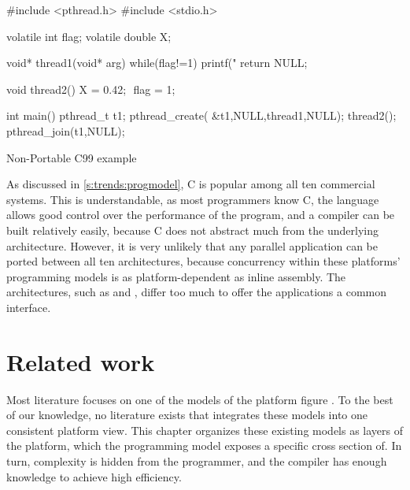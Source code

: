 \begin{lstcols}{2}%
\begin{lstcode}[variable={flag,X,arg,t1,arg},type={pthread_t}]
#include <pthread.h>
#include <stdio.h>

volatile int flag;
volatile double X;

void* thread1(void* arg){
	while(flag!=1){}
	printf("%
	return NULL;
}

void thread2(){
	X = 0.42; $\label{line:progmodel:c99:wr_double}$
	flag = 1;
}

int main(){
	pthread_t t1;
	pthread_create(
		&t1,NULL,thread1,NULL);
	thread2();
	pthread_join(t1,NULL);
}
\end{lstcode}\voidbox{)}%
\caption{Non-Portable C99 example}%
\label{lst:progmodel:c99_nonportable}%
\end{lstcols}

As discussed in \cref{s:trends:progmodel}, C is popular among all ten commercial systems.
This is understandable, as most programmers know C, the language allows good control over the performance of the program, and a compiler can be built relatively easily, because C does not abstract much from the underlying architecture.
However, it is very unlikely that any parallel application can be ported between all ten architectures, because concurrency within these platforms' programming models is as platform-dependent as inline assembly.
The architectures, such as \Epiphany and \OCTEON, differ too much to offer the applications a common interface.



\section{Related work}
\label{s:progmodel:related}

Most literature focuses on one of the models of the platform figure \chapfigpageref.
To the best of our knowledge, no literature exists that integrates these models into one consistent platform view.
This chapter organizes these existing models as layers of the platform, which the programming model exposes a specific cross section of.
In turn, complexity is hidden from the programmer, and the compiler has enough knowledge to achieve high efficiency.

